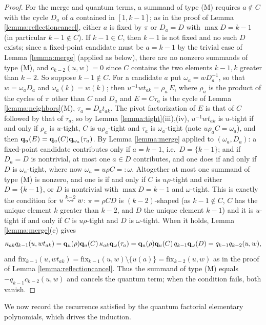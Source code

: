 \documentclass{amsart}
\theoremstyle{definition}
\theoremstyle{remark}
\numberwithin{equation}{section}
\newcommand{\xrightsquigarrow}[2][]{%
	\mathrel{\mathop{\rightsquigarrow}\limits^{\scriptstyle #2}%
	\ifx\hfuzz#1\hfuzz\else_{\scriptstyle #1}\fi}%
}
\newcommand{\tom}[1]{\ensuremath{\xrightsquigarrow{#1}}}
\newcommand{\fx}{\mathrm{fix}}
\begin{document}
\begin{proof}
For the merge and quantum terms, a summand of type (M) requires $a\notin C$ with the cycle $D_a$ of $a$ contained in $[1,k-1]$; as in the proof of Lemma \ref{lemma:reflectioncancel}, either $a$ is fixed by $\pi$ or $D_a=D$ with $\max D=k-1$ (in particular $k-1\notin C$). If $k-1\in C$, then $k-1$ is not fixed and no such $D$ exists; since a fixed-point candidate must be $a=k-1$ by the trivial case of Lemma \ref{lemma:merge} (applied as below), there are no nonzero summands of type (M), and $c_{k-2}(u,w)=0$ since $C$ contains the two elements $k-1,k$ greater than $k-2$. So suppose $k-1\notin C$. For a candidate $a$ put $\omega_a=wD_a^{-1}$, so that $w=\omega_aD_a$ and $\omega_a(k)=w(k)$; then $u^{-1}wt_{ak}=\rho_a\,E$, where $\rho_a$ is the product of the cycles of $\pi$ other than $C$ and $D_a$ and $E=C\tau_a$ is the cycle of Lemma \ref{lemma:neighbors}(M), $\tau_a=D_at_{ak}$. The pivot factorization of $E$ is that of $C$ followed by that of $\tau_a$, so by Lemma \ref{lemma:tight}(iii),(iv), $u^{-1}wt_{ak}$ is $u$-tight if and only if $\rho_a$ is $u$-tight, $C$ is $u\rho_a$-tight and $\tau_a$ is $\omega_a$-tight (note $u\rho_aC=\omega_a$), and then $\mathbf{q}_u(E)=\mathbf{q}_u(C)\mathbf{q}_{\omega_a}(\tau_a)$. By Lemma \ref{lemma:merge} applied to $(\omega_a,D_a)$: a fixed-point candidate contributes only if $a=k-1$, i.e.\ $D=\{k-1\}$; and if $D_a=D$ is nontrivial, at most one $a\in D$ contributes, and one does if and only if $D$ is $\omega_a$-tight, where now $\omega_a=u\rho C=:\omega$. Altogether at most one summand of type (M) is nonzero, and one is if and only if $C$ is $u\rho$-tight and either $D=\{k-1\}$, or $D$ is nontrivial with $\max D=k-1$ and $\omega$-tight. This is exactly the condition for $u\tom{k-2}w$: $\pi=\rho CD$ is $(k-2)$-shaped (as $k-1\notin C$, $C$ has the unique element $k$ greater than $k-2$, and $D$ the unique element $k-1$) and it is $u$-tight if and only if $C$ is $u\rho$-tight and $D$ is $\omega$-tight. When it holds, Lemma \ref{lemma:merge}(c) gives
$$\kappa_{ak}q_{k-1}(u,wt_{ak})=\mathbf{q}_u(\rho)\mathbf{q}_u(C)\,\kappa_{ak}\mathbf{q}_\omega(\tau_a)=\mathbf{q}_u(\rho)\mathbf{q}_u(C)\,q_{k-1}\mathbf{q}_\omega(D)=q_{k-1}q_{k-2}(u,w),$$
and $\fx_{k-1}(u,wt_{ak})=\fx_{k-1}(u,w)\setminus\{u(a)\}=\fx_{k-2}(u,w)$ as in the proof of Lemma \ref{lemma:reflectioncancel}. Thus the summand of type (M) equals $-q_{k-1}c_{k-2}(u,w)$ and cancels the quantum term; when the condition fails, both vanish.
\end{proof}

We now record the recurrence satisfied by the quantum factorial elementary polynomials, which drives the induction.
\end{document}
